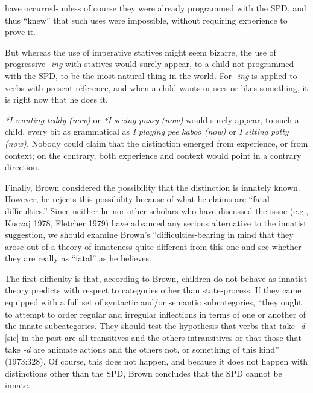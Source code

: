 
have occurred-unless of course they were already programmed with the SPD, and thus ``knew'' that such uses were impossible, without requiring experience to prove it.

But whereas the use of imperative statives might seem bizarre, the use of progressive \textit{{}-ing} with statives would surely appear, to a child not programmed with the SPD, to be the most natural thing in the world. For \textit{{}-ing} is applied to verbs with present reference, and when a child wants or sees or likes something, it is right now that he does it.

\textit{*I wanting} \textit{teddy} \textit{(now}\textit{)} or \textit{*I} \textit{seeing} \textit{pussy} \textit{(now}\textit{)} would surely appear, to such a child, every bit as grammatical as \textit{I} \textit{playing} \textit{pee} \textit{k}\textit{aboo} \textit{(now}\textit{)} or \textit{I} \textit{sitting} \textit{potty} \textit{(}\textit{now)}\textit{.} Nobody could claim that the distinction emerged from experience, or from context; on the contrary, both experience and context would point in a contrary direction.

Finally, Brown considered the possibility that the distinction is innately known. However, he rejects this possibility because of what he claims are ``fatal difficulties.'' Since neither he nor other scholars who have discussed the issue (e.g., Kuczaj 1978, Fletcher 1979) have advanced any serious alternative to the innatist suggestion, we should examine Brown's ``difficulties{\textquotedbl}{}-bearing in mind that they arose out of a theory of innateness quite different from this one-and see whether they are really as ``fatal'' as he believes.

The first difficulty is that, according to Brown, children do not behave as innatist theory predicts with respect to categories other than state-process. If they came equipped with a full set of syntactic and/or semantic subcategories, ``they ought to attempt to order regular and irregular inflections in terms of one or another of the innate subcate\-gories. They should test the hypothesis that verbs that take \textit{{}-d }[sic] in the past are all transitives and the others intransitives or that those that take \textit{{}-d} are animate actions and the others not, or something of this kind'' (1973:328). Of course, this does not happen, and because it does not happen with distinctions other than the SPD, Brown con\-cludes that the SPD cannot be innate.

